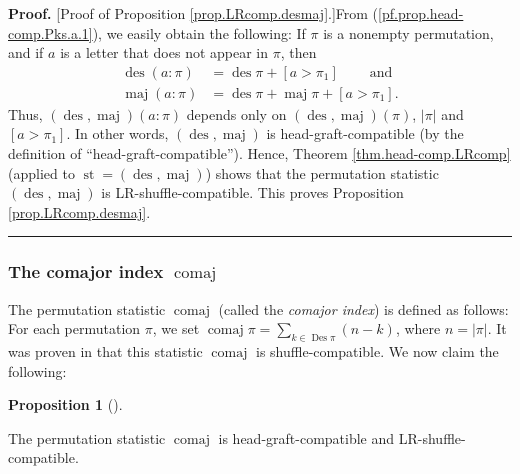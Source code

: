 \documentclass[numbers=enddot,12pt,final,onecolumn,notitlepage]{scrartcl}%
\theoremstyle{definition}
\newtheorem{prop}[theo]{Proposition}
\newenvironment{proposition}[1][]
{\begin{prop}[#1]\begin{leftbar}}
{\end{leftbar}\end{prop}}
\newenvironment{proof}[1][Proof]{\noindent\textbf{#1.} }{\ \rule{0.5em}{0.5em}}
\let\sumnonlimits\sum
\renewcommand{\sum}{\sumnonlimits\limits}
\begin{document}
\begin{proof}
[Proof of Proposition \ref{prop.LRcomp.desmaj}.]From
(\ref{pf.prop.head-comp.Pks.a.1}), we easily obtain the following: If $\pi$ is
a nonempty permutation, and if $a$ is a letter that does not appear in $\pi$,
then%
\begin{align*}
\operatorname*{des}\left(  a:\pi\right)   &  =\operatorname*{des}\pi+\left[
a>\pi_{1}\right]  \ \ \ \ \ \ \ \ \ \ \text{and}\\
\operatorname*{maj}\left(  a:\pi\right)   &  =\operatorname*{des}%
\pi+\operatorname*{maj}\pi+\left[  a>\pi_{1}\right]  .
\end{align*}
Thus, $\left(  \operatorname*{des},\operatorname*{maj}\right)  \left(
a:\pi\right)  $ depends only on $\left(  \operatorname*{des}%
,\operatorname*{maj}\right)  \left(  \pi\right)  $, $\left\vert \pi\right\vert
$ and $\left[  a>\pi_{1}\right]  $. In other words, $\left(
\operatorname*{des},\operatorname*{maj}\right)  $ is head-graft-compatible (by
the definition of \textquotedblleft head-graft-compatible\textquotedblright).
Hence, Theorem \ref{thm.head-comp.LRcomp} (applied to $\operatorname*{st}%
=\left(  \operatorname*{des},\operatorname*{maj}\right)  $) shows that the
permutation statistic $\left(  \operatorname*{des},\operatorname*{maj}\right)
$ is LR-shuffle-compatible. This proves Proposition \ref{prop.LRcomp.desmaj}.
\end{proof}

\subsubsection{The comajor index $\operatorname*{comaj}$}

The permutation statistic $\operatorname*{comaj}$ (called the \textit{comajor
index}) is defined as follows: For each permutation $\pi$, we set
$\operatorname*{comaj}\pi=\sum_{k\in\operatorname*{Des}\pi}\left(  n-k\right)
$, where $n=\left\vert \pi\right\vert $. It was proven in \cite[\S 3.2]{part1}
that this statistic $\operatorname*{comaj}$ is shuffle-compatible. We now
claim the following:

\begin{proposition}
\label{prop.LRcomp.comaj}The permutation statistic $\operatorname*{comaj}$ is
head-graft-compatible and LR-shuffle-compatible.
\end{proposition}
\end{document}
